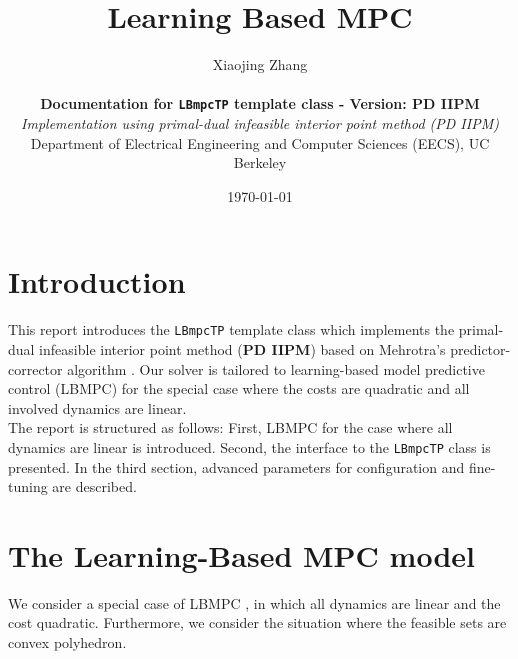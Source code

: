 \documentclass[letter]{article}
\date{\today}
\author{Xiaojing Zhang \\ \\
 	{\bf Documentation for \texttt{LBmpcTP} template class - Version: PD IIPM} \\
 	{\it Implementation using primal-dual infeasible interior point method (PD IIPM)} \\
 	 Department of Electrical Engineering and Computer Sciences (EECS), UC Berkeley}
\title{Learning Based MPC}
\begin{document}
\pagestyle{headings}	%
\maketitle

\begin{sffamily}		%


\newcommand{\sinc}{\mathrm{sinc}}
\renewcommand{\thefootnote}{\fnsymbol{footnote}}

\section*{Introduction}
This report introduces the \texttt{LBmpcTP} template class which implements the primal-dual infeasible interior point method (\textbf{PD IIPM}) based on Mehrotra's predictor-corrector algorithm \citep{Mehrotra1992PDIPM}. Our solver is tailored to  learning-based model predictive control (LBMPC) \citep{Aswani2011LBMPC} for the special case where the costs are quadratic and all involved dynamics are linear.\\

\noindent
The report is structured as follows: First, LBMPC for the case where all dynamics are linear is introduced. Second, the interface to the \texttt{LBmpcTP} class is presented. In the third section, advanced parameters for configuration and fine-tuning are described.

\section{The Learning-Based MPC model}
We consider a special case of LBMPC \citep{Aswani2011LBMPC}, in which all dynamics are linear and the cost quadratic. Furthermore, we consider the situation where the feasible sets are convex polyhedron. \\


\end{sffamily}
\end{document}
